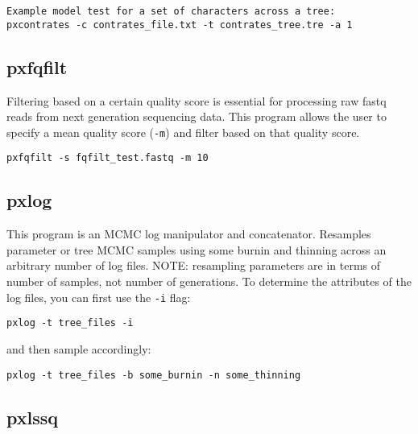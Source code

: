 \documentclass[12pt,letterpaper]{memoir}
\begin{document}
\begin{flushleft}
\begin{verbatim}
Example model test for a set of characters across a tree:
pxcontrates -c contrates_file.txt -t contrates_tree.tre -a 1
\end{verbatim}
\end{flushleft}

\subsection{pxfqfilt}

Filtering based on a certain quality score is essential for processing raw fastq reads from next generation sequencing data. This program allows the user to specify a mean quality score (\texttt{-m}) and filter based on that quality score.

\begin{flushleft}
\begin{verbatim}
pxfqfilt -s fqfilt_test.fastq -m 10
\end{verbatim}
\end{flushleft}

\subsection{pxlog}

This program is an MCMC log manipulator and concatenator. Resamples parameter or tree MCMC samples using some burnin and thinning across an arbitrary number of log files. NOTE: resampling parameters are in terms of number of samples, not number of generations. To determine the attributes of the log files, you can first use the \texttt{-i} flag:

\begin{flushleft}
\begin{verbatim}
pxlog -t tree_files -i
\end{verbatim}
\end{flushleft}
and then sample accordingly:
\begin{flushleft}
\begin{verbatim}
pxlog -t tree_files -b some_burnin -n some_thinning
\end{verbatim}
\end{flushleft}

\subsection{pxlssq}
\end{document}
